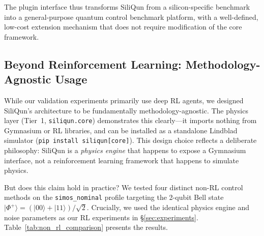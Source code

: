 The plugin interface thus transforms SiliQun from a silicon-specific
benchmark into a general-purpose quantum control benchmark platform,
with a well-defined, low-cost extension mechanism that does not require
modification of the core framework.


\subsection{Beyond Reinforcement Learning: Methodology-Agnostic Usage}
\label{subsec:non_rl_usage}
While our validation experiments primarily use deep RL agents, we designed SiliQun's
architecture to be fundamentally methodology-agnostic. The physics layer
(Tier~1, \texttt{siliqun.core}) demonstrates this clearly---it imports nothing from
Gymnasium or RL libraries, and can be installed as a standalone Lindblad simulator
(\texttt{pip install siliqun[core]}). This design choice reflects a deliberate
philosophy: SiliQun is a \emph{physics engine} that happens to expose a Gymnasium
interface, not a reinforcement learning framework that happens to simulate physics.

But does this claim hold in practice? We tested four distinct non-RL control methods
on the \texttt{simos\_nominal} profile targeting the 2-qubit Bell state
$|\Phi^+\rangle = (|00\rangle + |11\rangle)/\sqrt{2}$. Crucially, we used the
identical physics engine and noise parameters as our RL experiments in
\S\ref{sec:experiments}. Table~\ref{tab:non_rl_comparison} presents the results.

